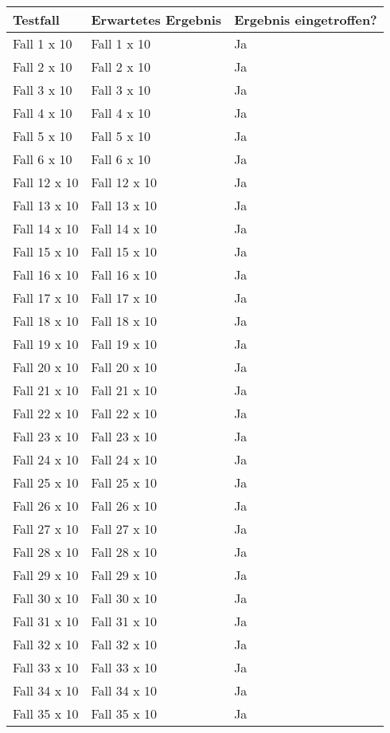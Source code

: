 \begin{tabularx}{\textwidth}{|X|X|p{3cm}|}
    \hline
    \textbf{Testfall} & \textbf{Erwartetes Ergebnis} & \textbf{Ergebnis eingetroffen?}\\
    \hline
    Fall 1 x 10 & Fall 1 x 10 & Ja\\
    \hline
    Fall 2 x 10 & Fall 2 x 10 & Ja\\
    \hline
    Fall 3 x 10 & Fall 3 x 10 & Ja\\
    \hline
    Fall 4 x 10 & Fall 4 x 10 & Ja\\
    \hline
    Fall 5 x 10 & Fall 5 x 10 & Ja\\
    \hline
    Fall 6 x 10 & Fall 6 x 10 & Ja\\
    \hline
    Fall 12 x 10 & Fall 12 x 10 & Ja\\
    \hline
    Fall 13 x 10 & Fall 13 x 10 & Ja\\
    \hline
    Fall 14 x 10 & Fall 14 x 10 & Ja\\
    \hline
    Fall 15 x 10 & Fall 15 x 10 & Ja\\
    \hline
    Fall 16 x 10 & Fall 16 x 10 & Ja\\
    \hline
    Fall 17 x 10 & Fall 17 x 10 & Ja\\
    \hline
    Fall 18 x 10 & Fall 18 x 10 & Ja\\
    \hline
    Fall 19 x 10 & Fall 19 x 10 & Ja\\
    \hline
    Fall 20 x 10 & Fall 20 x 10 & Ja\\
    \hline
    Fall 21 x 10 & Fall 21 x 10 & Ja\\
    \hline
    Fall 22 x 10 & Fall 22 x 10 & Ja\\
    \hline
    Fall 23 x 10 & Fall 23 x 10 & Ja\\
    \hline
    Fall 24 x 10 & Fall 24 x 10 & Ja\\
    \hline
    Fall 25 x 10 & Fall 25 x 10 & Ja\\
    \hline
    Fall 26 x 10 & Fall 26 x 10 & Ja\\
    \hline
    Fall 27 x 10 & Fall 27 x 10 & Ja\\
    \hline
    Fall 28 x 10 & Fall 28 x 10 & Ja\\
    \hline 
    Fall 29 x 10 & Fall 29 x 10 & Ja\\
    \hline
    Fall 30 x 10 & Fall 30 x 10 & Ja\\
    \hline
    Fall 31 x 10 & Fall 31 x 10 & Ja\\
    \hline
    Fall 32 x 10 & Fall 32 x 10 & Ja\\
    \hline
    Fall 33 x 10 & Fall 33 x 10 & Ja\\
    \hline
    Fall 34 x 10 & Fall 34 x 10 & Ja\\
    \hline
    Fall 35 x 10 & Fall 35 x 10 & Ja\\
    \hline
\end{tabularx}


